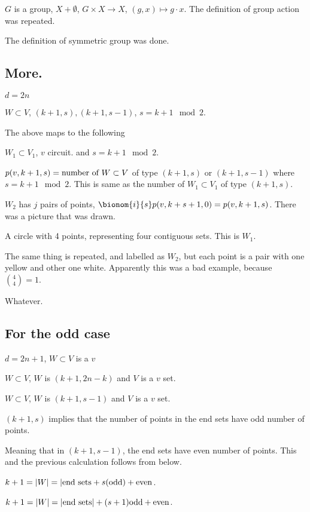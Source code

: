 \documentclass[11pt]{article}
\begin{document}
{{\(G\) is a group, \(X + \emptyset\), \(G \times X \rightarrow X\), \((g, x) \mapsto
   g \cdot x\). The definition of group action was repeated.

The definition of symmetric group was done. 
\subsection{More.}
\label{sec:orgbd2607c}
\(d = 2n\)

\(W \subset V\), \((k + 1, s), (k+1, s - 1)\), \(s = k + 1 \mod 2\).

The above maps to  the following

\(W_1 \subset V_1\), \(v\) circuit. and \(s = k + 1 \mod 2\).

\(p(v, k + 1, s) = \textup{number of } W \subset V\) of type \((k+1, s)\) or
\((k + 1, s- 1)\) where \(s = k + 1 \mod 2\). This is same as the number of \(W_1
   \subset V_1\) of type \((k + 1, s)\).

\(W_2\) has \(j\) pairs of points, \(\bionom{i}{s} p(v, k+s + 1, 0) = p(v, k+1,
   s)\). There was a picture that was drawn.

A circle with 4 points, representing four contiguous sets. This is \(W_1\).

The same thing is repeated, and labelled as \(W_2\), but each point is a pair
with one yellow and other one white. Apparently this was a bad example,
because \(\binom{4}{4} = 1\).

Whatever.
\subsection{For the odd case}
\label{sec:org1a310be}
\(d = 2n + 1\), \(W \subset V\) is a \(v\) 

\(W \subset V\), \(W\) is \((k + 1, 2n - k)\) and \(V\) is a \(v\) set.

\(W \subset V\), \(W\) is \((k + 1, s - 1)\) and \(V\) is a \(v\) set.

\((k + 1, s)\) implies that the number of points in the end sets have odd
number of points.

Meaning that in \((k + 1, s - 1)\), the end sets have even number of points.
This and the previous calculation follows from below.

\(k + 1 = \vert W \vert = \vert \textup{end sets} + s(\textup{odd}) +
   \textup{even}\).

\(k + 1 = \vert W \vert = \vert \textup{end sets} \vert + ( s + 1)
   \textup{odd} + \textup{even}\).

}}
\end{document}
